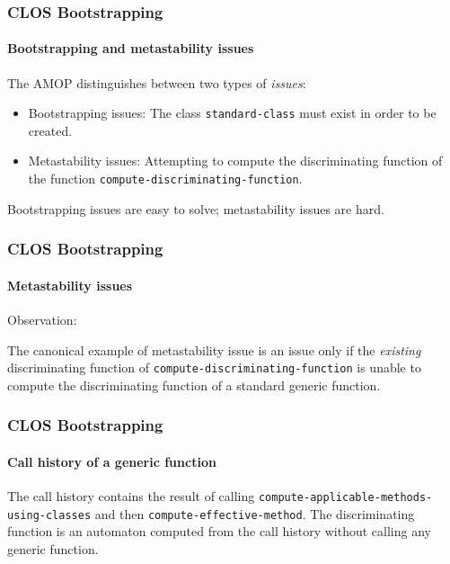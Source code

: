 \documentclass{beamer}
\begin{document}
\begin{frame}
  \frametitle{CLOS Bootstrapping}
  \framesubtitle{Bootstrapping and metastability issues}

The AMOP distinguishes between two types of \emph{issues}:
\vskip 0.5cm
\begin{itemize}
\item Bootstrapping issues: The class \texttt{standard-class} must exist in
  order to be created.
\item Metastability issues: Attempting to compute the discriminating function
  of the function \texttt{compute-discriminating-function}.
\end{itemize}

Bootstrapping issues are easy to solve; metastability issues are hard.

\end{frame}
\begin{frame}
  \frametitle{CLOS Bootstrapping}
  \framesubtitle{Metastability issues}

Observation:
\vskip 0.5cm

The canonical example of metastability issue is an issue only if the
\emph{existing} discriminating function of
\texttt{compute-discriminating-function} is unable to compute the
discriminating function of a standard generic function.

\end{frame}
\begin{frame}
  \frametitle{CLOS Bootstrapping}
  \framesubtitle{Call history of a generic function}

The call history contains the result of calling
\texttt{compute-applicable-methods-using-classes} and then
\texttt{compute-effective-method}.
\vskip 0.25cm
The discriminating function is an automaton computed from the call
history without calling any generic function.

\end{frame}
\end{document}
